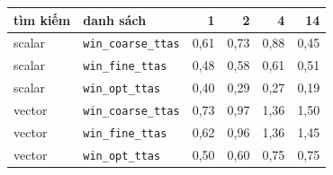 \begin{tabular}{llrrrr}
\toprule
tìm kiếm & danh sách & 1 & 2 & 4 & 14 \\
\midrule
scalar & \texttt{win\_coarse\_ttas} & 0,61 & 0,73 & 0,88 & 0,45 \\
scalar & \texttt{win\_fine\_ttas} & 0,48 & 0,58 & 0,61 & 0,51 \\
scalar & \texttt{win\_opt\_ttas} & 0,40 & 0,29 & 0,27 & 0,19 \\
\midrule
vector & \texttt{win\_coarse\_ttas} & 0,73 & 0,97 & 1,36 & 1,50 \\
vector & \texttt{win\_fine\_ttas} & 0,62 & 0,96 & 1,36 & 1,45 \\
vector & \texttt{win\_opt\_ttas} & 0,50 & 0,60 & 0,75 & 0,75 \\
\bottomrule
\end{tabular}
